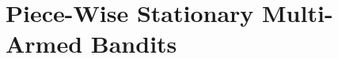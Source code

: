 

\chapter{Piece-Wise Stationary Multi-Armed Bandits}
\label{chapter:6}

\graphicspath{{2-Chapters/6-Chapter/Images/}}


